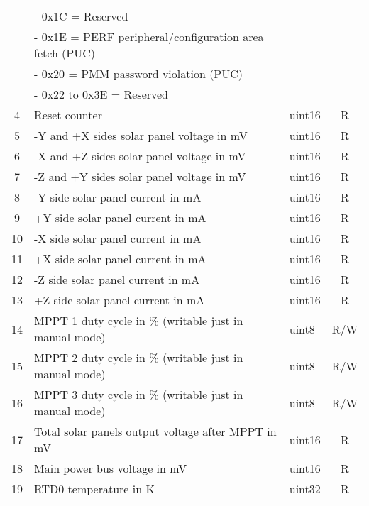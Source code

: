 \begin{longtable}[c]{cL{0.72\textwidth}lc}
        & - 0x1C = Reserved                                                 &        &  \\
        & - 0x1E = PERF peripheral/configuration area fetch (PUC)           &        &  \\
        & - 0x20 = PMM password violation (PUC)                             &        &  \\
        & - 0x22 to 0x3E = Reserved                                         &        &  \\
    4   & Reset counter                                                     & uint16 & R \\
    5   & -Y and +X sides solar panel voltage in mV                         & uint16 & R \\
    6   & -X and +Z sides solar panel voltage in mV                         & uint16 & R \\
    7   & -Z and +Y sides solar panel voltage in mV                         & uint16 & R \\
    8   & -Y side solar panel current in mA                                 & uint16 & R \\
    9   & +Y side solar panel current in mA                                 & uint16 & R \\
    10  & -X side solar panel current in mA                                 & uint16 & R \\
    11  & +X side solar panel current in mA                                 & uint16 & R \\
    12  & -Z side solar panel current in mA                                 & uint16 & R \\
    13  & +Z side solar panel current in mA                                 & uint16 & R \\
    14  & MPPT 1 duty cycle in \% (writable just in manual mode)            & uint8  & R/W \\
    15  & MPPT 2 duty cycle in \% (writable just in manual mode)            & uint8  & R/W \\
    16  & MPPT 3 duty cycle in \% (writable just in manual mode)            & uint8  & R/W \\
    17  & Total solar panels output voltage after MPPT in mV                & uint16 & R \\
    18  & Main power bus voltage in mV                                      & uint16 & R \\
    19  & RTD0 temperature in K                                             & uint32 & R \\

\end{longtable}
